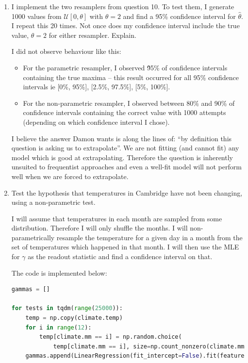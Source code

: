 \documentclass[10pt,\jkfside,a4paper]{article}
\begin{document}
\begin{enumerate}
\item I implement the two resamplers from question 10. To test them, I
generate 1000 values from $\mathcal{U}[0, \theta]$ with $\theta = 2$ and
find a 95\% confidence interval for $\hat{\theta}$. I repeat this 20 times.
Not once does my confidence interval include the true value, $\theta = 2$
for either resampler. Explain.

I did not observe behaviour like this:

\begin{itemize}

\item
For the parametric resampler, I observed \~95\% of confidence intervals
containing the true maxima -- this result occurred for all 95\% confidence
intervals ie [0\%, 95\%], [2.5\%, 97.5\%], [5\%, 100\%].

\item
For the non-parametric resampler, I observed between 80\% and 90\% of
confidence intervals containing the correct value with 1000 attempts
(depending on which confidence interval I chose).

\end{itemize}

I believe the answer Damon wants is along the lines of: ``by definition this
question is asking us to extrapolate''. We are not fitting (and cannot fit)
any model which is good at extrapolating. Therefore the question is
inherently unsuited to frequentist approaches and even a well-fit model will
not perform well when we are forced to extrapolate.

\item Test the hypothesis that temperatures in Cambridge have not been
changing, using a non-parametric test.

I will assume that temperatures in each month are sampled from some
distribution. Therefore I will only shuffle the months. I will
non-parametrically resample the temperature for a given day in a month
from the set of temperatures which happened in that month.
I will then use the MLE for $\gamma$ as the readout statistic and find a
confidence interval on that.

The code is implemented below:

\begin{lstlisting}[language=Python]
gammas = []

for tests in tqdm(range(25000)):
    temp = np.copy(climate.temp)
    for i in range(12):
        temp[climate.mm == i] = np.random.choice(
        	temp[climate.mm == i], size=np.count_nonzero(climate.mm == i))
    gammas.append(LinearRegression(fit_intercept=False).fit(features, temp).coef_[3])
\end{lstlisting}


\end{enumerate}
\end{document}
